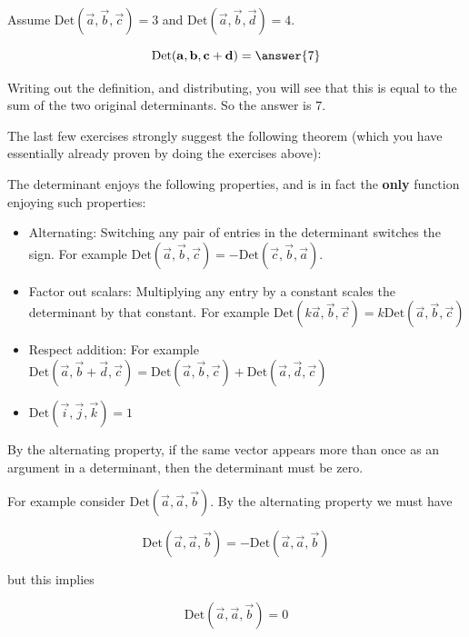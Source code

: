 \documentclass{ximera}
\begin{document}
	\begin{question}
		Assume $\textrm{Det}(\vec{a},\vec{b},\vec{c}) = 3$ and $\textrm{Det}(\vec{a},\vec{b},\vec{d}) = 4$.
		
		\[
		\textrm{Det}(\vec{a},\vec{b},\vec{c}+\vec{d}) = \answer{7}
		\]
		
		\begin{hint}
			Writing out the definition, and distributing, you will see that this is equal to the sum of the two original determinants.  So the answer is $7$.
		\end{hint}
	\end{question}
	
	The last few exercises strongly suggest the following theorem (which you have essentially already proven by doing the exercises above):
	
	\begin{theorem}
		The determinant enjoys the following properties, and is in fact the \textbf{only} function enjoying such properties:
		
		\begin{itemize}
			\item Alternating:  Switching any pair of entries in the determinant switches the sign.  For example $\textrm{Det}(\vec{a},\vec{b},\vec{c}) = -\textrm{Det}(\vec{c},\vec{b},\vec{a})$.
			\item Factor out scalars:  Multiplying any entry by a constant scales the determinant by that constant.  For example
			 $\textrm{Det}(k\vec{a},\vec{b},\vec{c}) = k\textrm{Det}(\vec{a},\vec{b},\vec{c}) $
			 
			 \item Respect addition:  For example $\textrm{Det}(\vec{a},\vec{b}+\vec{d},\vec{c}) = \textrm{Det}(\vec{a},\vec{b},\vec{c}) +\textrm{Det}(\vec{a},\vec{d},\vec{c}) $ 
			 
			 \item $\textrm{Det}(\vec{i},\vec{j},\vec{k}) = 1 $
			 \end{itemize}
	\end{theorem}
	
	\begin{observation}
		By the alternating property, if the same vector appears more than once as an argument in a determinant, then the determinant must be zero.
		
		For example consider $\textrm{Det}(\vec{a},\vec{a},\vec{b})$. By the alternating property we must have
		
		\[
		\textrm{Det}(\vec{a},\vec{a},\vec{b}) = -\textrm{Det}(\vec{a},\vec{a},\vec{b})
		\]
		
		but this implies 
		
		\[
		\textrm{Det}(\vec{a},\vec{a},\vec{b})=0
		\]
	\end{observation}
	
\end{document}
